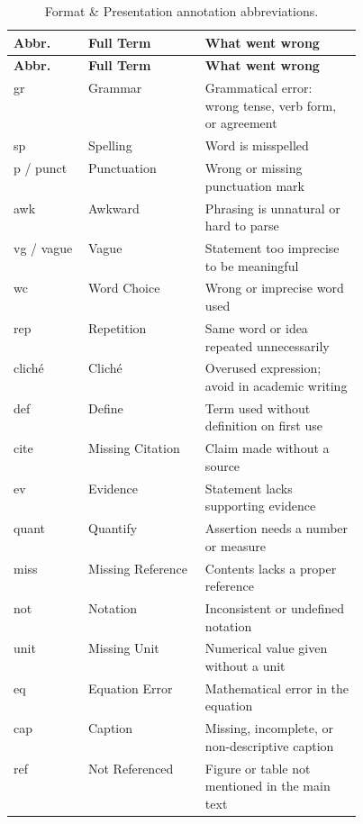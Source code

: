 \documentclass{../sharedAssets/tufte}
\begin{document}
\begin{longtable}{@{\extracolsep{\fill}}llp{0.45\linewidth}}
  \caption{Format \& Presentation annotation abbreviations.}\\
  \toprule
  \textbf{Abbr.} & \textbf{Full Term} & \textbf{What went wrong} \\
  \midrule
  \endfirsthead
  \toprule
  \textbf{Abbr.} & \textbf{Full Term} & \textbf{What went wrong} \\
  \midrule
  \endhead
  \bottomrule
  \endlastfoot
  gr          & Grammar             & Grammatical error: wrong tense, verb form, or agreement \\
  sp          & Spelling            & Word is misspelled \\
  p / punct   & Punctuation         & Wrong or missing punctuation mark \\
  awk         & Awkward             & Phrasing is unnatural or hard to parse \\
  vg / vague  & Vague               & Statement too imprecise to be meaningful \\
  wc          & Word Choice         & Wrong or imprecise word used \\
  rep         & Repetition          & Same word or idea repeated unnecessarily \\
  clich\'e    & Clich\'e            & Overused expression; avoid in academic writing \\
  def         & Define              & Term used without definition on first use \\
  cite        & Missing Citation    & Claim made without a source \\
  ev          & Evidence            & Statement lacks supporting evidence \\
  quant       & Quantify            & Assertion needs a number or measure \\
  miss        & Missing Reference   & Contents lacks a proper reference \\
  not         & Notation            & Inconsistent or undefined notation \\
  unit        & Missing Unit        & Numerical value given without a unit \\
  eq          & Equation Error      & Mathematical error in the equation \\
  cap         & Caption             & Missing, incomplete, or non-descriptive caption \\
  ref         & Not Referenced      & Figure or table not mentioned in the main text \\

\end{longtable}
\end{document}
